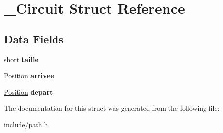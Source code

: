 \hypertarget{struct___circuit}{\section{\-\_\-\-Circuit Struct Reference}
\label{struct___circuit}
}
\subsection*{Data Fields}
\begin{DoxyCompactItemize}
\item 
\hypertarget{struct___circuit_acfcd34187090e6be2c8d6548a83cb660}{short {\bfseries taille}}\label{struct___circuit_acfcd34187090e6be2c8d6548a83cb660}

\item 
\hypertarget{struct___circuit_ab587ab86b4447ff27f9d59156cb8a6db}{\hyperlink{struct___position}{Position} {\bfseries arrivee}}\label{struct___circuit_ab587ab86b4447ff27f9d59156cb8a6db}

\item 
\hypertarget{struct___circuit_ab702de429f28137453a1ad4197f2ec9f}{\hyperlink{struct___position}{Position} {\bfseries depart}}\label{struct___circuit_ab702de429f28137453a1ad4197f2ec9f}

\end{DoxyCompactItemize}


The documentation for this struct was generated from the following file\-:\begin{DoxyCompactItemize}
\item 
include/\hyperlink{path_8h}{path.\-h}\end{DoxyCompactItemize}
